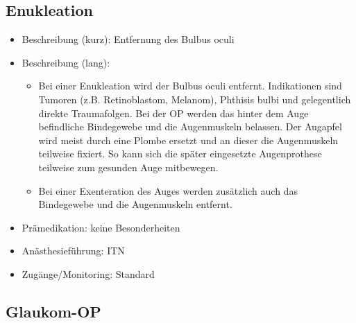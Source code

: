 \documentclass[
]{book}
\providecommand{\tightlist}{%
  \setlength{\itemsep}{0pt}\setlength{\parskip}{0pt}}
\begin{document}
\hypertarget{enukleation}{%
\subsection{Enukleation}\label{enukleation}}

\begin{itemize}
\tightlist
\item
  Beschreibung (kurz): Entfernung des Bulbus oculi\\
\item
  Beschreibung (lang):

  \begin{itemize}
  \tightlist
  \item
    Bei einer Enukleation wird der Bulbus oculi entfernt. Indikationen sind Tumoren (z.B. Retinoblastom, Melanom), Phthisis bulbi und gelegentlich direkte Traumafolgen. Bei der OP werden das hinter dem Auge befindliche Bindegewebe und die Augenmuskeln belassen. Der Augapfel wird meist durch eine Plombe ersetzt und an dieser die Augenmuskeln teilweise fixiert. So kann sich die später eingesetzte Augenprothese teilweise zum gesunden Auge mitbewegen.
  \item
    Bei einer Exenteration des Auges werden zusätzlich auch das Bindegewebe und die Augenmuskeln entfernt.
  \end{itemize}
\item
  Prämedikation: keine Besonderheiten
\item
  Anästhesieführung: ITN
\item
  Zugänge/Monitoring: Standard
\end{itemize}

\hypertarget{glaukom-op}{%
\subsection{Glaukom-OP}\label{glaukom-op}}
\end{document}
